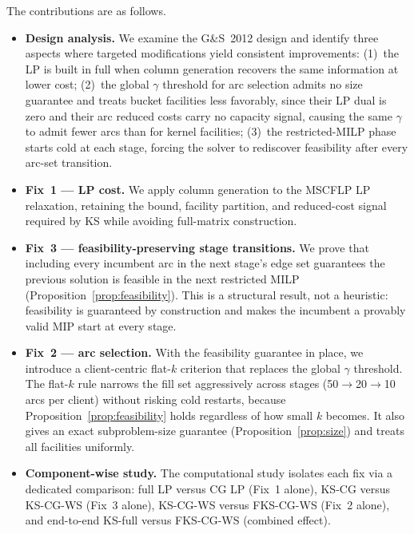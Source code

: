 The contributions are as follows.
\begin{itemize}
  \item \textbf{Design analysis.}
        We examine the G\&S~2012 design and identify three aspects where
        targeted modifications yield consistent improvements:
        (1)~the LP is built in full when column generation recovers the same
        information at lower cost;
        (2)~the global $\gamma$ threshold for arc selection admits no size
        guarantee and treats bucket facilities less favorably, since their LP
        dual is zero and their arc reduced costs carry no capacity signal,
        causing the same $\gamma$ to admit fewer arcs than for kernel
        facilities;
        (3)~the restricted-MILP phase starts cold at each stage, forcing the
        solver to rediscover feasibility after every arc-set transition.
  \item \textbf{Fix~1 --- LP cost.}
        We apply column generation to the MSCFLP LP relaxation,
        retaining the bound, facility partition, and reduced-cost signal
        required by KS while avoiding full-matrix construction.
  \item \textbf{Fix~3 --- feasibility-preserving stage transitions.}
        We prove that including every incumbent arc in the next stage's edge set
        guarantees the previous solution is feasible in the next restricted MILP
        (Proposition~\ref{prop:feasibility}).
        This is a structural result, not a heuristic: feasibility is guaranteed
        by construction and makes the incumbent a provably valid MIP start at
        every stage.
  \item \textbf{Fix~2 --- arc selection.}
        With the feasibility guarantee in place, we introduce a client-centric
        flat-$k$ criterion that replaces the global $\gamma$ threshold.
        The flat-$k$ rule narrows the fill set aggressively across stages
        (50$\to$20$\to$10 arcs per client) without risking cold restarts,
        because Proposition~\ref{prop:feasibility} holds regardless of how
        small $k$ becomes.
        It also gives an exact subproblem-size guarantee
        (Proposition~\ref{prop:size}) and treats all facilities uniformly.
  \item \textbf{Component-wise study.}
        The computational study isolates each fix via a dedicated comparison:
        full LP versus CG LP (Fix~1 alone), KS-CG versus KS-CG-WS (Fix~3
        alone), KS-CG-WS versus FKS-CG-WS (Fix~2 alone), and end-to-end
        KS-full versus FKS-CG-WS (combined effect).
\end{itemize}

